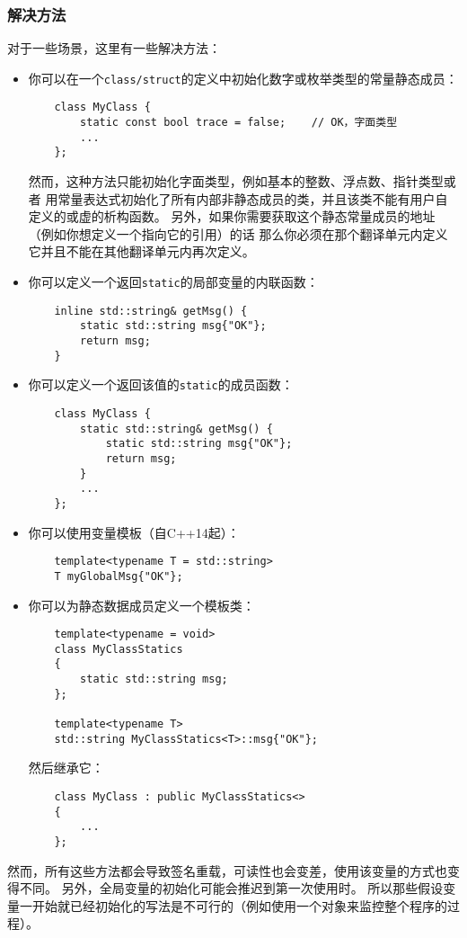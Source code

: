 \subsubsection{解决方法}
对于一些场景，这里有一些解决方法：
\begin{itemize}
    \item 你可以在一个\texttt{class/struct}的定义中初始化数字或枚举类型的常量静态成员：
    \begin{lstlisting}
    class MyClass {
        static const bool trace = false;    // OK，字面类型
        ...
    };
    \end{lstlisting}
    然而，这种方法只能初始化字面类型，例如基本的整数、浮点数、指针类型或者
    用常量表达式初始化了所有内部非静态成员的类，并且该类不能有用户自定义的或虚的析构函数。
    另外，如果你需要获取这个静态常量成员的地址（例如你想定义一个指向它的引用）的话
    那么你必须在那个翻译单元内定义它并且不能在其他翻译单元内再次定义。
    \item 你可以定义一个返回\texttt{static}的局部变量的内联函数：
    \begin{lstlisting}
    inline std::string& getMsg() {
        static std::string msg{"OK"};
        return msg;
    }
    \end{lstlisting}
    \item 你可以定义一个返回该值的\texttt{static}的成员函数：
    \begin{lstlisting}
    class MyClass {
        static std::string& getMsg() {
            static std::string msg{"OK"};
            return msg;
        }
        ...
    };
    \end{lstlisting}
    \item 你可以使用变量模板（自C++14起）：
    \begin{lstlisting}
    template<typename T = std::string>
    T myGlobalMsg{"OK"};
    \end{lstlisting}
    \item 你可以为静态数据成员定义一个模板类：
    \begin{lstlisting}
    template<typename = void>
    class MyClassStatics
    {
        static std::string msg;
    };

    template<typename T>
    std::string MyClassStatics<T>::msg{"OK"};
    \end{lstlisting}
    然后继承它：
    \begin{lstlisting}
    class MyClass : public MyClassStatics<>
    {
        ...
    };
    \end{lstlisting}
\end{itemize}
然而，所有这些方法都会导致签名重载，可读性也会变差，使用该变量的方式也变得不同。
另外，全局变量的初始化可能会推迟到第一次使用时。
所以那些假设变量一开始就已经初始化的写法是不可行的（例如使用一个对象来监控整个程序的过程）。


